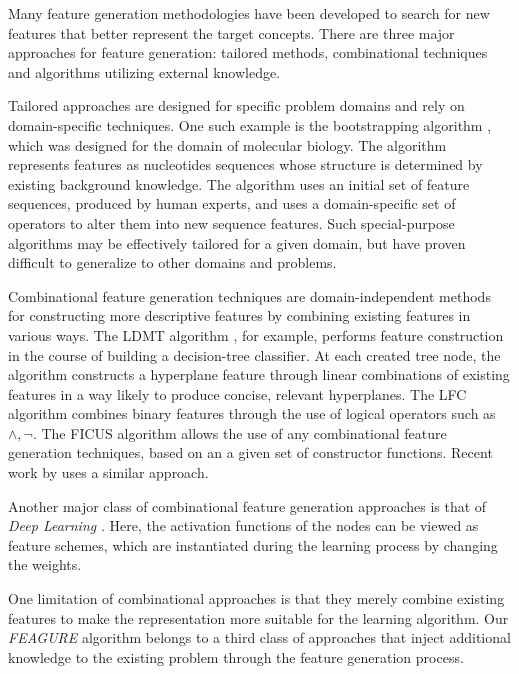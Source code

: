 \documentclass[twoside,11pt]{article}
\theoremstyle{definition}
\begin{document}
Many feature generation methodologies have been developed to search for new features that better represent the target concepts. There are three major approaches for feature generation: tailored methods, combinational techniques and algorithms utilizing external knowledge.

Tailored approaches \cite{sutton1991learning,hirsh1994bootstrapping} are designed for specific problem domains and rely on domain-specific techniques. %
One such example is the bootstrapping algorithm \cite{hirsh1994bootstrapping}, which was designed for the domain of molecular biology. The algorithm represents features as nucleotides sequences whose structure is determined by existing background knowledge. The algorithm uses an initial set of feature sequences, produced by human experts, and uses a domain-specific set of operators to alter them into new sequence features. 
Such special-purpose algorithms  may be effectively tailored for a given domain, but have proven difficult to generalize to other domains and problems.

Combinational feature generation techniques are domain-independent methods for constructing more descriptive features by combining existing features in various ways. The LDMT algorithm \cite{utgo1991linear}, for example, performs feature construction in the course of building a decision-tree classifier. At each created tree node, the algorithm constructs a hyperplane feature through linear combinations of existing features in a way likely to produce concise, relevant hyperplanes. The LFC algorithm \cite{ragavan1993complex} combines binary features through the use of logical operators such as $\land ,\lnot$.
The FICUS algorithm \cite{markovitch2002feature} allows the use of any combinational feature generation techniques, based on an a given set of constructor functions. Recent work by  uses a similar approach.

Another major class of combinational feature generation approaches is that of \emph{Deep Learning} . Here, the  activation functions of the nodes can be viewed as feature schemes, which are instantiated during the learning process by changing the weights.

One limitation of combinational approaches is that they merely combine existing features to make the representation more suitable for the 
learning algorithm. 
Our \emph{FEAGURE} algorithm belongs to a third class of approaches that inject additional knowledge to the existing problem through the feature generation process.
	
\end{document}
